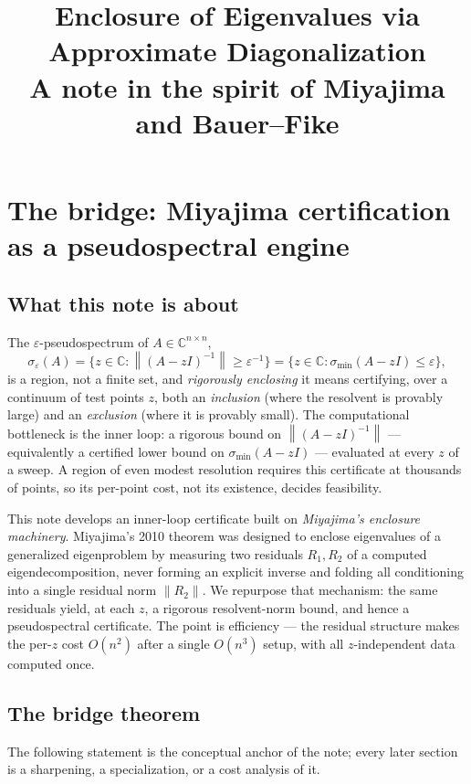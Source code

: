 \documentclass[11pt, a4paper]{article}
\title{\textbf{Enclosure of Eigenvalues via Approximate Diagonalization}\\[0.4em]
\large A note in the spirit of Miyajima and Bauer--Fike}
\author{}
\date{}
\numberwithin{equation}{section}
\newcommand{\norm}[1]{\left\|#1\right\|}
\newcommand{\C}{\mathbb{C}}
\begin{document}
\maketitle

\section{The bridge: Miyajima certification as a pseudospectral engine}

\subsection{What this note is about}

The $\varepsilon$-pseudospectrum of $A \in \C^{n\times n}$,
\[
  \sigma_\varepsilon(A)
    = \bigl\{ z \in \C : \norm{(A - zI)^{-1}} \ge \varepsilon^{-1} \bigr\}
    = \bigl\{ z \in \C : \sigma_{\min}(A - zI) \le \varepsilon \bigr\},
\]
is a region, not a finite set, and \emph{rigorously enclosing} it means
certifying, over a continuum of test points $z$, both an \emph{inclusion}
(where the resolvent is provably large) and an \emph{exclusion} (where it is
provably small).  The computational bottleneck is the inner loop: a rigorous
bound on $\norm{(A - zI)^{-1}}$ --- equivalently a certified lower bound on
$\sigma_{\min}(A - zI)$ --- evaluated at every $z$ of a sweep.  A region of even
modest resolution requires this certificate at thousands of points, so its
per-point cost, not its existence, decides feasibility.

This note develops an inner-loop certificate built on \emph{Miyajima's
enclosure machinery}.  Miyajima's 2010 theorem was designed to enclose
eigenvalues of a generalized eigenproblem by measuring two residuals $R_1, R_2$
of a computed eigendecomposition, never forming an explicit inverse and folding
all conditioning into a single residual norm $\norm{R_2}$.  We repurpose that
mechanism: the same residuals yield, at each $z$, a rigorous resolvent-norm
bound, and hence a pseudospectral certificate.  The point is efficiency --- the
residual structure makes the per-$z$ cost $O(n^2)$ after a single $O(n^3)$
setup, with all $z$-independent data computed once.

\subsection{The bridge theorem}

The following statement is the conceptual anchor of the note; every later
section is a sharpening, a specialization, or a cost analysis of it.
\end{document}
